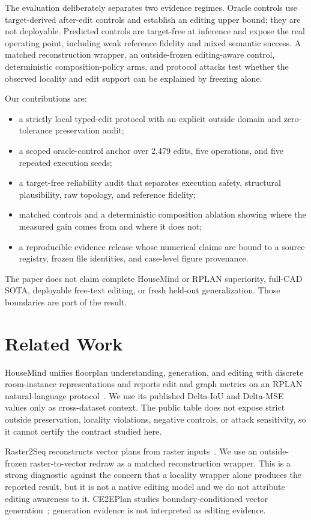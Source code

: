 \documentclass[10pt,twocolumn,letterpaper]{article}
\begin{document}
The evaluation deliberately separates two evidence regimes. Oracle controls use
target-derived after-edit controls and establish an editing upper bound; they are
not deployable. Predicted controls are target-free at inference and expose the
real operating point, including weak reference fidelity and mixed semantic
success. A matched reconstruction wrapper, an outside-frozen editing-aware
control, deterministic composition-policy arms, and protocol attacks test whether
the observed locality and edit support can be explained by freezing alone.

Our contributions are:
\begin{itemize}
\item a strictly local typed-edit protocol with an explicit outside domain and
zero-tolerance preservation audit;
\item a scoped oracle-control anchor over 2,479 edits, five operations, and five
repeated execution seeds;
\item a target-free reliability audit that separates execution safety,
structural plausibility, raw topology, and reference fidelity;
\item matched controls and a deterministic composition ablation showing where the
measured gain comes from and where it does not;
\item a reproducible evidence release whose numerical claims are bound to a
source registry, frozen file identities, and case-level figure provenance.
\end{itemize}

The paper does not claim complete HouseMind or RPLAN superiority, full-CAD SOTA,
deployable free-text editing, or fresh held-out generalization. Those boundaries
are part of the result.

\section{Related Work}
HouseMind unifies floorplan understanding, generation, and editing with discrete
room-instance representations and reports edit and graph metrics on an RPLAN
natural-language protocol~\cite{housemind}. We use its published Delta-IoU and
Delta-MSE values only as cross-dataset context. The public table does not expose
strict outside preservation, locality violations, negative controls, or attack
sensitivity, so it cannot certify the contract studied here.

Raster2Seq reconstructs vector plans from raster inputs~\cite{raster2seq}. We use
an outside-frozen raster-to-vector redraw as a matched reconstruction wrapper.
This is a strong diagnostic against the concern that a locality wrapper alone
produces the reported result, but it is not a native editing model and we do not
attribute editing awareness to it. CE2EPlan studies boundary-conditioned vector
generation~\cite{ce2eplan}; generation evidence is not interpreted as editing
evidence.
\end{document}
